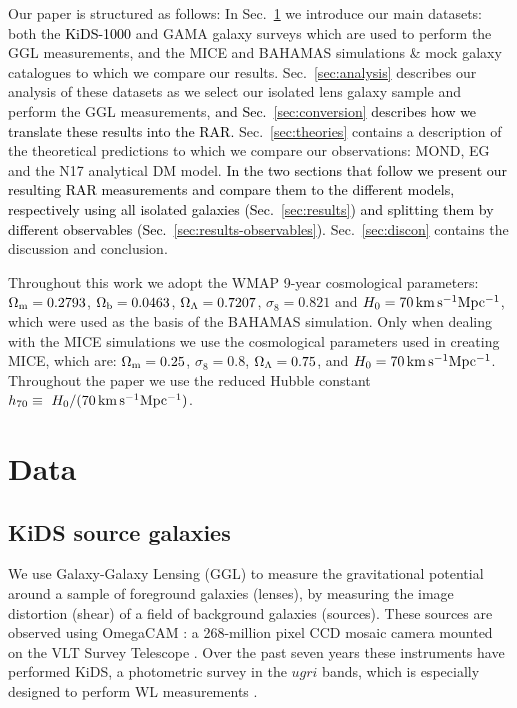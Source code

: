 \documentclass[usenatbib]{mnras}
\newcommand{\un}[1]{_{\rm #1}}
\begin{document}
Our paper is structured as follows: In Sec.~\ref{sec:data} we introduce our main datasets: both the \textcolor{black}{KiDS-1000} and GAMA galaxy surveys which are used to perform the GGL measurements, and the MICE and BAHAMAS simulations \& mock galaxy catalogues to which we compare our results. Sec.~\ref{sec:analysis} describes our analysis of these datasets as we select our isolated lens galaxy sample and perform the GGL measurements, \textcolor{black}{and Sec.~\ref{sec:conversion} describes how we translate these results into the RAR.} Sec.~\ref{sec:theories} contains a description of the theoretical predictions to which we compare our observations: MOND, EG and the N17 analytical DM model. \textcolor{black}{In the two sections that follow we present our resulting RAR measurements and compare them to the different models, respectively using all isolated galaxies (Sec.~\ref{sec:results}) and splitting them by different observables (Sec.~\ref{sec:results-observables}).} Sec.~\ref{sec:discon} contains the discussion and conclusion.

Throughout this work we adopt the WMAP 9-year \cite[]{hinshaw2013} cosmological parameters: $\Omega\un{m}=0.2793$, $\Omega\un{b}=0.0463$, $\Omega\un{\Lambda}=0.7207$, $\sigma_8=0.821$ and $H_0 = 70 \, {\rm km \, s^{-1} Mpc^{-1}}$, which were used as the basis of the BAHAMAS simulation. Only when dealing with the MICE simulations we use the cosmological parameters used in creating MICE, which are: $\Omega\un{m}=0.25$, $\sigma_8=0.8$, $\Omega\un{\Lambda}=0.75$, and $H_0 = 70 \, {\rm km \, s^{-1} Mpc^{-1}}$. Throughout the paper we use the reduced Hubble constant $h_{70} \equiv \ H_0 / (70 \, {\rm km \, s^{-1} Mpc^{-1}})$.

\section{Data}
\label{sec:data}

\subsection{KiDS source galaxies}
\label{sec:kids}

We use Galaxy-Galaxy Lensing (GGL) to measure the gravitational potential around a sample of foreground galaxies (lenses), by measuring the image distortion (shear) of a field of background galaxies (sources). These sources are observed using OmegaCAM \cite[]{kuijken2011}: a 268-million pixel CCD mosaic
camera mounted on the VLT Survey Telescope \cite[]{capaccioli2011}. Over the past seven years these instruments have performed KiDS, a photometric survey in the $ugri$ bands, which is especially designed to perform WL measurements \cite[]{dejong2013}.
\end{document}
